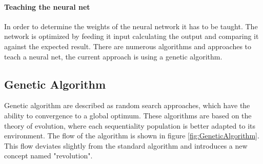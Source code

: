 \documentclass[11pt,fleqn,,a4paper,twoside,openright]{book}
\begin{document}
\paragraph{Teaching the neural net}
In order to determine the weights of the neural network it has to be taught. The network is optimized by feeding it input calculating the output and comparing it against the expected result. There are numerous algorithms and approaches to teach a neural net, the current approach is using a genetic algorithm.

\subsection{Genetic Algorithm}
Genetic algorithm are described as random search approaches, which have the ability to convergence to a global optimum. These algorithms are based on the theory of evolution, where each sequentiality population is better adapted to its environment. The flow of the algorithm is shown in figure \ref{fig:GeneticAlgorithm}. This flow deviates slightly from the standard algorithm and introduces a new concept named "revolution".
\end{document}
